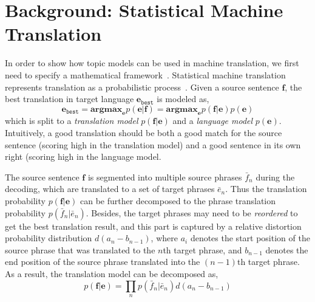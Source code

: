 \section{Background: Statistical Machine Translation}

In order to show how topic models can be used in machine translation, we first need to specify a mathematical framework~\citep{koehn-03}.
Statistical machine translation represents translation as a
probabilistic process~\citep{koehn-09}.  Given a source sentence $\mathbf{f}$, the best
translation in target language $\mathbf{e}_\texttt{best}$ is modeled
as,
\begin{equation}
\mathbf{e}_\texttt{best} = \textbf{argmax}_\mathbf{e} p(\mathbf{e}|\mathbf{f}) = \textbf{argmax}_\mathbf{e} p(\mathbf{f}|\mathbf{e}) p (\mathbf{e})
\end{equation}
which is split to a \textit{translation model}
$p(\mathbf{f}|\mathbf{e})$ and a \textit{language model} $p
(\mathbf{e})$.
Intuitively, a good translation should be both a good match for the source sentence (scoring high in the translation model) and a good sentence in its own right (scoring high in the language model.

The source sentence $\mathbf{f}$ is segmented into multiple source
phrases $\bar{f}_n$ during the decoding, which are translated to a set
of target phrases $\bar{e}_n$. Thus the translation probability
$p(\mathbf{f}|\mathbf{e})$ can be further decomposed to the phrase
translation probability $p(\bar{f}_n | \bar{e}_n)$. Besides, the
target phrases may need to be \textit{reordered} to get the best
translation result, and this part is captured by a relative distortion
probability distribution $d(a_n - b_{n-1})$, where $a_i$ denotes the
start position of the source phrase that was translated to the $n$th
target phrase, and $b_{n-1}$ denotes the end position of the source
phrase translated into the $(n-1)$th target phrase. As a result, the
translation model can be decomposed as,
\begin{equation}
p(\mathbf{f}|\mathbf{e}) = \prod_{n} p(\bar{f}_n | \bar{e}_n) d(a_n - b_{n-1})
\end{equation}

